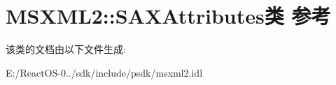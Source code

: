 \hypertarget{class_m_s_x_m_l2_1_1_s_a_x_attributes}{}\section{M\+S\+X\+M\+L2\+:\+:S\+A\+X\+Attributes类 参考}
\label{class_m_s_x_m_l2_1_1_s_a_x_attributes}


该类的文档由以下文件生成\+:\begin{DoxyCompactItemize}
\item 
E\+:/\+React\+O\+S-\/0../sdk/include/psdk/msxml2.\+idl\end{DoxyCompactItemize}
